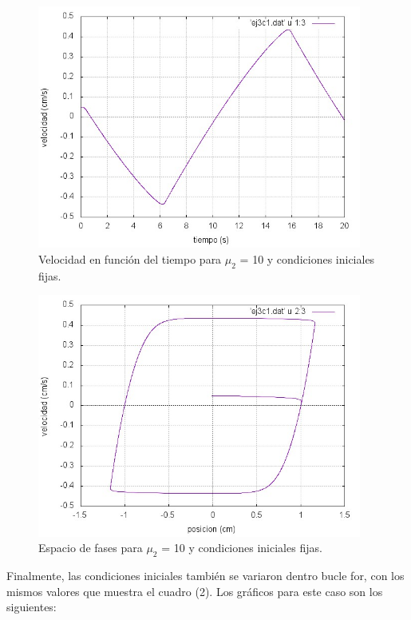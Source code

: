 \documentclass[a4paper,12pt]{article}
\begin{document}
\begin{itemize}
\begin{figure}[H]
\begin{center}
\includegraphics[height=8cm]{grafico_ej3c1_vVSt.jpg}
\caption[width=5cm]{Velocidad en funci\'on del tiempo para $\mu_2$ = 10 y condiciones iniciales fijas.}
\end{center}
\end{figure}

\begin{figure}[H]
\begin{center}
\includegraphics[height=8cm]{grafico_ej3c1_xVSv.jpg}
\caption[width=5cm]{Espacio de fases para $\mu_2$ = 10 y condiciones iniciales fijas.}
\end{center}
\end{figure}




Finalmente, las condiciones iniciales tambi\'en se variaron dentro bucle for, con los mismos valores que muestra el cuadro (2). Los gr\'aficos para este caso son los siguientes:


\end{itemize}
\end{document}

